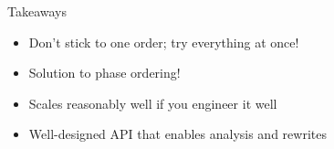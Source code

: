 \documentclass[8pt]{beamer}
\begin{document}


\begin{frame}[fragile]{Takeaways}
\begin{itemize}
\item Don't stick to one order; try everything at once!
\item Solution to phase ordering!
\item Scales reasonably well if you engineer it well
\item Well-designed API that enables analysis and rewrites
\end{itemize}
\end{frame}
\end{document}
